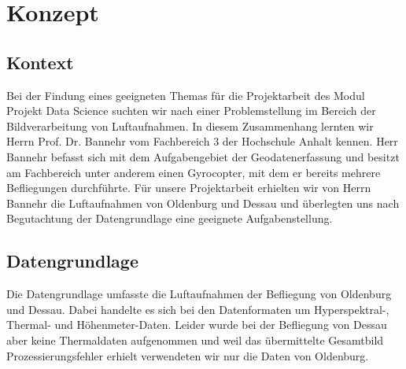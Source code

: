 
\newcommand{\Heading}{Team Gyrocopter}
\newcommand{\Modul}{Projekt Data Science}

\newcommand{\Dozent}{Dozent: Prof. Dr. Christian Hänig}





\chapter{Konzept}\thispagestyle{fancy}

\section{Kontext}

Bei der Findung eines geeigneten Themas für die Projektarbeit des Modul \glqq Projekt Data Science\grqq{}  suchten wir
nach einer Problemstellung im Bereich der Bildverarbeitung von Luftaufnahmen.
In diesem Zusammenhang lernten wir Herrn Prof. Dr. Bannehr vom Fachbereich 3 der Hochschule Anhalt kennen.
Herr Bannehr befasst sich mit dem Aufgabengebiet der Geodatenerfassung und besitzt am Fachbereich unter anderem einen
Gyrocopter, mit dem er bereits mehrere Befliegungen durchführte.
Für unsere Projektarbeit erhielten wir von Herrn Bannehr die Luftaufnahmen von Oldenburg und Dessau und überlegten uns
nach Begutachtung der Datengrundlage eine geeignete Aufgabenstellung.

\section{Datengrundlage}
Die Datengrundlage umfasste die Luftaufnahmen der Befliegung von Oldenburg und Dessau.
Dabei handelte es sich bei den Datenformaten um Hyperspektral-, Thermal- und Höhenmeter-Daten.
Leider wurde bei der Befliegung von Dessau aber keine Thermaldaten aufgenommen und weil das übermittelte Gesamtbild
Prozessierungsfehler erhielt verwendeten wir nur die Daten von Oldenburg.

